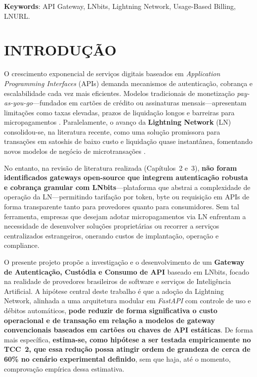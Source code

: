 \documentclass[openright]{normas-utf-tex}
\begin{document}
\noindent\textbf{Keywords}: API Gateway, LNbits, Lightning Network, Usage-Based Billing, LNURL.

\chapter{INTRODUÇÃO}
O crescimento exponencial de serviços digitais baseados em \textit{Application Programming Interfaces} (APIs) demanda mecanismos de autenticação, cobrança e escalabilidade cada vez mais eficientes. Modelos tradicionais de monetização \textit{pay-as-you-go}—fundados em cartões de crédito ou assinaturas mensais—apresentam limitações como taxas elevadas, prazos de liquidação longos e barreiras para micropagamentos \cite{rozik2022apieconomy,trefke2020usagebased}. Paralelamente, o avanço da \textbf{Lightning Network} (LN) consolidou-se, na literatura recente, como uma solução promissora para transações em satoshis de baixo custo e liquidação quase instantânea, fomentando novos modelos de negócio de microtransações \cite{poon2016lightning,rodriguez2024survey,vargas2019lightning}.

No entanto, na revisão de literatura realizada (Capítulos~2 e~3), \textbf{não foram identificados gateways open-source que integrem autenticação robusta e cobrança granular com LNbits}—plataforma que abstrai a complexidade de operação da LN—permitindo tarifação por token, byte ou requisição em APIs de forma transparente tanto para provedores quanto para consumidores. Sem tal ferramenta, empresas que desejam adotar micropagamentos via LN enfrentam a necessidade de desenvolver soluções proprietárias ou recorrer a serviços centralizados estrangeiros, onerando custos de implantação, operação e compliance.

O presente projeto propõe a investigação e o desenvolvimento de um \textbf{Gateway de Autenticação, Custódia e Consumo de API} baseado em LNbits, focado na realidade de provedores brasileiros de software e serviços de Inteligência Artificial. A hipótese central deste trabalho é que a adoção da Lightning Network, alinhada a uma arquitetura modular em \textit{FastAPI} com controle de uso e débitos automáticos, \textbf{pode reduzir de forma significativa o custo operacional e de transação em relação a modelos de gateway convencionais baseados em cartões ou chaves de API estáticas}. De forma mais específica, \textbf{estima-se, como hipótese a ser testada empiricamente no TCC~2, que essa redução possa atingir ordem de grandeza de cerca de 60\% no cenário experimental definido}, sem que haja, até o momento, comprovação empírica dessa estimativa.
\end{document}
